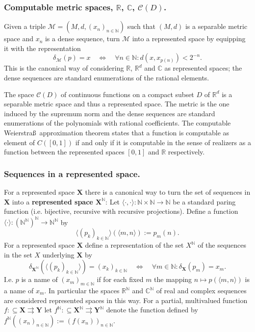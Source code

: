\documentclass{eptcs-modified}
\newcommand{\Baire}{{\mathbb{N}^\mathbb{N}}}
\newcommand{\uint}{{[0,1]}}
\newcommand{\mto}{\rightrightarrows}
\newcommand{\demph}{\textbf}
\newcommand{\NN}{\mathbb{N}}
\newcommand{\RR}{\mathbb{R}}
\newcommand{\CC}{\mathbb{C}}
\newcommand{\XX}{\mathbf{X}}
\newcommand{\YY}{\mathbf{Y}}
\newcommand{\cont}{\mathcal C(D)}
\begin{document}
			\subsubsection*{Computable metric spaces, $\RR$, $\CC$, $\cont$.}
				Given a triple $\mathcal M = (M,d,(x_n)_{n\in \NN})$ such that $(M,d)$ is a separable metric space and $x_n$ is a dense sequence, turn $\mathcal M$ into a represented space by equipping it with the representation
				\[ \delta_{\mathcal M}(p) = x \quad \Leftrightarrow\quad \forall n\in \NN: d(x,x_{p(n)}) < 2^{-n}. \]
				This is the canonical way of considering $\RR$, $\RR^d$ and $\CC$ as represented spaces; the dense sequences are standard enumerations of the rational elements.

				The space $\cont$ of continuous functions on a compact subset $D$ of $\RR^d$ is a separable metric space and thus a represented space.
				The metric is the one induced by the supremum norm and the dense sequences are standard enumerations of the polynomials with rational coefficients.
				The computable Weierstra\ss\ approximation theorem states that a function is computable as element of $C([0,1])$ if and only if it is computable in the sense of realizers as a function between the represented spaces $\uint$ and $\RR$ respectively.

			\subsubsection*{Sequences in a represented space.}

				For a represented space $\XX$ there is a canonical way to turn the set of sequences in $\XX$ into a \demph{represented space $\XX^\NN$}:
				Let $\langle\cdot,\cdot\rangle:\NN\times \NN \to \NN$ be a standard paring function (i.e. bijective, recursive with recursive projections).
				Define a function $\langle\cdot\rangle:\left(\Baire\right)^\NN\to \Baire$ by
				\[ \langle (p_k)_{k\in \NN}\rangle(\langle m,n\rangle) := p_m(n). \]
				For a represented space $\XX$ define a representation of the set $X^\NN$ of the sequences in the set $X$ underlying $\XX$ by
				\[ \delta_{\XX^\NN}(\langle (p_k)_{k\in\NN}\rangle) =(x_k)_{k\in\NN} \quad \Leftrightarrow \quad \forall m\in\NN: \delta_{\XX}(p_m) = x_m. \]
				I.e. $p$ is a name of $(x_m)_{m\in\NN}$ if for each fixed $m$ the mapping $n\mapsto p(\langle m,n\rangle)$ is a name of $x_m$.
				In particular the spaces $\RR^\NN$ and $\CC^\NN$ of real and complex sequences are considered represented spaces in this way.
				For a partial, multivalued function $f:\subseteq\XX\mto\YY$ let $f^\NN:\subseteq\XX^\NN\mto\YY^\NN$ denote the function defined by $f^\NN((x_n)_{n\in\NN}):= (f(x_n))_{n\in\NN}$.
\end{document}
